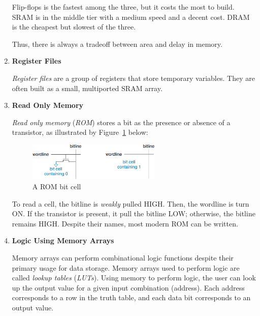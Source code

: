 \documentclass[12pt]{article}
\numberwithin{figure}{subsection}
\numberwithin{table}{subsection}
\numberwithin{equation}{subsection}
\begin{document}
\begin{enumerate}
  Flip-flops is the fastest among the three, but it costs the most to build. SRAM is in the middle tier with a medium speed and a decent cost. DRAM is the cheapest but slowest of the three.

  Thus, there is always a tradeoff between area and delay in memory.

  \item \textbf{Register Files}

  \textit{Register files} are a group of registers that store temporary variables. They are often built as a small, multiported SRAM array.

  \item \textbf{Read Only Memory}

  \textit{Read only memory} (\textit{ROM}) stores a bit as the presence or absence of a transistor, as illustrated by Figure~\ref{fig:rom_bit_cell} below:

  \begin{figure}[ht]
    \centering
    \includegraphics[width=0.6\textwidth]{rom_bit_cell.png}
    \caption{A ROM bit cell}
    \label{fig:rom_bit_cell}
  \end{figure}

  To read a cell, the bitline is \textit{weakly} pulled HIGH. Then, the wordline is turn ON. If the transistor is present, it pull the bitline LOW; otherwise, the bitline remains HIGH. Despite their names, most modern ROM can be written.

  \item \textbf{Logic Using Memory Arrays}

  Memory arrays can perform combinational logic functions despite their primary usage for data storage. Memory arrays used to perform logic are called \textit{lookup tables} (\textit{LUTs}). Using memory to perform logic, the user can look up the output value for a given input combination (address). Each address corresponds to a row in the truth table, and each data bit corresponds to an output value.
\end{enumerate}
\end{document}
